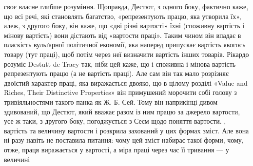 {своє власне глибше розуміння. Щоправда, Дестют, з одного боку, фактично каже, що всі речі, які
становлять багатство, «репрезентують працю, яка утворила їх», алеж, з другого боку, він каже, що
«дві різні вартості» їхні (споживну вартість і мінову вартість) вони дістають від «вартости праці».
Таким чином він впадає в пласкість вульґарної політичної економії, яка наперед припускає вартість
якогось товару (тут праці), щоб потім через неї визначити вартість інших товарів. Рікардо розуміє
Destutt de Tracy так, ніби цей каже, що і споживна і мінова вартість репрезентують працю (а не
вартість праці). Але сам він так мало розрізняє двоїстий характер праці, яка виражається двояко, що
в цілому розділі «Value and Riches, Their Distinctive Properties» він примушений морочити собі
голову з тривіяльностями такого панка як Ж. Б. Сей. Тому він наприкінці дивом здивований, що Дестют,
який вважає разом із ним працю за джерело вартости, усе ж таки, з другого боку, погоджується з Сеєм
щодо поняття вартости.
}, вартість та величину вартости і
розкрила захований у цих формах зміст. Але вона ні разу навіть не поставила питання: чому цей зміст
набирає такої форми, чому, отже, праця виражається у вартості, а міра праці через час її тривання —
у величині
\parbreak{}  %
